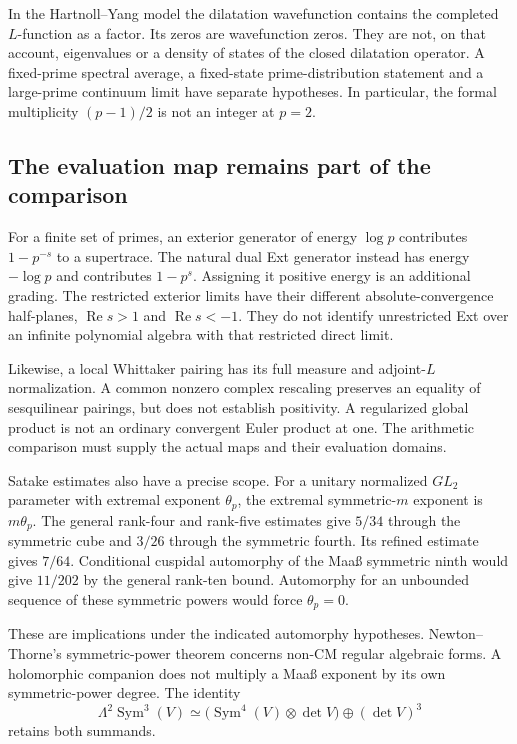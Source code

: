 In the Hartnoll--Yang model the dilatation wavefunction contains
the completed \(L\)-function as a factor.
Its zeros are wavefunction zeros.
They are not, on that account, eigenvalues or a density of
states of the closed dilatation operator.
A fixed-prime spectral average, a fixed-state prime-distribution
statement and a large-prime continuum limit have separate
hypotheses. In particular, the formal multiplicity
\((p-1)/2\) is not an integer at \(p=2\).

\subsection{The evaluation map remains part of the comparison}

For a finite set of primes, an exterior generator of energy
\(\log p\) contributes \(1-p^{-s}\) to a supertrace.
The natural dual Ext generator instead has energy \(-\log p\)
and contributes \(1-p^s\).
Assigning it positive energy is an additional grading.
The restricted exterior limits have their different
absolute-convergence half-planes,
\(\operatorname{Re}s>1\) and \(\operatorname{Re}s<-1\).
They do not identify unrestricted Ext over an infinite polynomial
algebra with that restricted direct limit.

Likewise, a local Whittaker pairing has its full measure and
adjoint-\(L\) normalization.
A common nonzero complex rescaling preserves an equality of
sesquilinear pairings, but does not establish positivity.
A regularized global product is not an ordinary convergent
Euler product at one.
The arithmetic comparison must supply the actual maps and
their evaluation domains.

Satake estimates also have a precise scope.
For a unitary normalized \(GL_2\) parameter with extremal exponent
\(\theta_p\), the extremal symmetric-\(m\) exponent is \(m\theta_p\).
The general rank-four and rank-five estimates give
\(5/34\) through the symmetric cube and \(3/26\) through
the symmetric fourth. Its refined estimate gives \(7/64\).
Conditional cuspidal automorphy of the Maaß symmetric ninth
would give \(11/202\) by the general rank-ten bound.
Automorphy for an unbounded sequence of these symmetric powers
would force \(\theta_p=0\).

These are implications under the indicated automorphy hypotheses.
Newton--Thorne's symmetric-power theorem concerns non-CM regular
algebraic forms. A holomorphic companion does not multiply
a Maaß exponent by its own symmetric-power degree.
The identity
\[
 \Lambda^2\operatorname{Sym}^3(V)
 \simeq
 \bigl(\operatorname{Sym}^4(V)\otimes\det V\bigr)
       \oplus(\det V)^3
\]
retains both summands.


